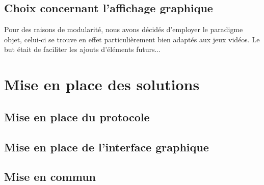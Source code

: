 \documentclass[12pt]{report}
\begin{document}
\chapter{Choix concernant l'affichage graphique} %
Pour des raisons de modularité, nous avons décidés d'employer le
paradigme objet, celui-ci se trouve en effet particulièrement bien
adaptés aux jeux vidéos. Le but était de faciliter les ajouts
d'éléments futurs...

\part{Mise en place des solutions}
\chapter{Mise en place du protocole}

\chapter{Mise en place de l'interface graphique}

\chapter{Mise en commun}
\end{document}
